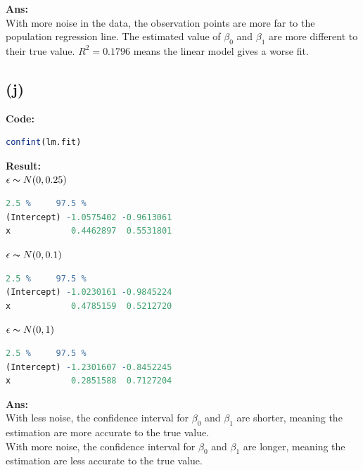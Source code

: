 \documentclass[twoside]{homework}
\begin{document}
\textbf{Ans:}\\
With more noise in the data, the observation points are more far to the population regression line. The estimated value of $\beta_0$ and $\beta_1$ are more different to their true value. $R^2 = 0.1796$ means the linear model gives a worse fit. 

\subsection*{(j)}
\textbf{Code:}
\begin{lstlisting}[language=R]
confint(lm.fit)
\end{lstlisting}
\textbf{Result:}\\
$\epsilon \thicksim N(0, 0.25)$
\begin{lstlisting}[language=R]
                 2.5 %     97.5 %
(Intercept) -1.0575402 -0.9613061
x            0.4462897  0.5531801
\end{lstlisting}
$\epsilon \thicksim N(0, 0.1)$
\begin{lstlisting}[language=R]
                 2.5 %     97.5 %
(Intercept) -1.0230161 -0.9845224
x            0.4785159  0.5212720
\end{lstlisting}
$\epsilon \thicksim N(0, 1)$
\begin{lstlisting}[language=R]
                 2.5 %     97.5 %
(Intercept) -1.2301607 -0.8452245
x            0.2851588  0.7127204
\end{lstlisting}
\textbf{Ans:}\\
With less noise, the confidence interval for $\beta_0$ and $\beta_1$ are shorter, meaning the estimation are more accurate to the true value. \\
With more noise, the confidence interval for $\beta_0$ and $\beta_1$ are longer, meaning the estimation are less accurate to the true value. 

\newpage
\end{document}
